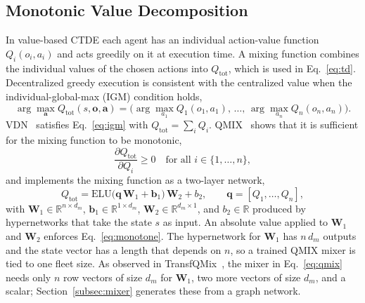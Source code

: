 \subsection{Monotonic Value Decomposition}
\label{subsec:monotonic}
In value-based CTDE each agent has an individual action-value function $Q_i(o_i,a_i)$ and
acts greedily on it at execution time. A mixing function combines the individual values of
the chosen actions into $Q_{\text{tot}}$, which is used in Eq.~\eqref{eq:td}. Decentralized
greedy execution is consistent with the centralized value when the individual-global-max
(IGM) condition holds,
\begin{equation}
\label{eq:igm}
\arg\max_{\mathbf{a}} Q_{\text{tot}}(s,\mathbf{o},\mathbf{a}) =
\big(\arg\max_{a_1}Q_1(o_1,a_1),\,\dots,\,\arg\max_{a_n}Q_n(o_n,a_n)\big).
\end{equation}
VDN~\cite{vdn} satisfies Eq.~\eqref{eq:igm} with $Q_{\text{tot}}=\sum_i Q_i$.
QMIX~\cite{qmix} shows that it is sufficient for the mixing function to be monotonic,
\begin{equation}
\label{eq:monotone}
\frac{\partial Q_{\text{tot}}}{\partial Q_i} \ge 0 \quad \text{for all } i\in\{1,\dots,n\},
\end{equation}
and implements the mixing function as a two-layer network,
\begin{equation}
\label{eq:qmix}
Q_{\text{tot}} = \mathrm{ELU}\big(\mathbf{q}\,\mathbf{W}_1 + \mathbf{b}_1\big)\,\mathbf{W}_2 + b_2,
\qquad \mathbf{q} = [Q_1,\dots,Q_n],
\end{equation}
with $\mathbf{W}_1\in\mathbb{R}^{n\times d_m}$, $\mathbf{b}_1\in\mathbb{R}^{1\times d_m}$,
$\mathbf{W}_2\in\mathbb{R}^{d_m\times 1}$, and $b_2\in\mathbb{R}$ produced by hypernetworks
that take the state $s$ as input. An absolute value applied to $\mathbf{W}_1$ and
$\mathbf{W}_2$ enforces Eq.~\eqref{eq:monotone}. The hypernetwork for $\mathbf{W}_1$ has
$n\,d_m$ outputs and the state vector has a length that depends on $n$, so a trained QMIX
mixer is tied to one fleet size. As observed in TransfQMix~\cite{transfqmix}, the mixer in
Eq.~\eqref{eq:qmix} needs only $n$ row vectors of size $d_m$ for $\mathbf{W}_1$, two more
vectors of size $d_m$, and a scalar; Section~\ref{subsec:mixer} generates these from a graph
network.

